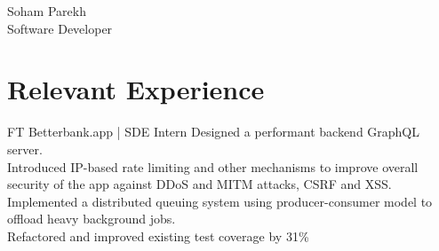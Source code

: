 \documentclass[10pt]{article} %
\begin{document}
\begin{paracol}{2} %


\parbox[top][0.10\textheight][c]{\linewidth}{ %
	\vspace{-0.04\textheight} %
	\centering %
	{\sffamily\Huge Soham Parekh}\\\medskip %
	{\Huge\color{headings} Software Developer}
}


\section{Relevant Experience}





{FT} %
{} 
{Betterbank.app | \small{SDE Intern}} %
{
\textbullet{} Designed a performant backend GraphQL server. \\
\textbullet{} Introduced IP-based rate limiting and other mechanisms to improve overall security of the app against DDoS and MITM attacks, CSRF and XSS. \\
\textbullet{} Implemented a distributed queuing system using producer-consumer model to offload heavy background jobs. \\
\textbullet{} Refactored and improved existing test coverage by 31\%
} %



\end{paracol}
\end{document}
